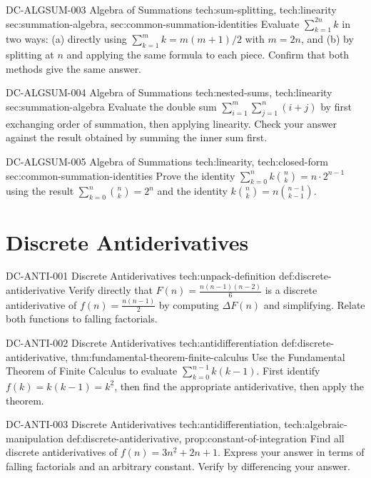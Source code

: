 \exstubgenfull
  {DC-ALGSUM-003}
  {Algebra of Summations}
  {tech:sum-splitting, tech:linearity}
  {sec:summation-algebra, sec:common-summation-identities}
  {Evaluate \(\displaystyle\sum_{k=1}^{2n} k\) in two ways:
  (a) directly using \(\sum_{k=1}^{m}k = m(m+1)/2\) with \(m = 2n\), and
  (b) by splitting at \(n\) and applying the same formula to each piece.
  Confirm that both methods give the same answer.}

\exstubgenfull
  {DC-ALGSUM-004}
  {Algebra of Summations}
  {tech:nested-sums, tech:linearity}
  {sec:summation-algebra}
  {Evaluate the double sum
  \(\displaystyle\sum_{i=1}^{m}\sum_{j=1}^{n}(i+j)\)
  by first exchanging order of summation, then applying linearity.
  Check your answer against the result obtained by summing
  the inner sum first.}

\exstubgenfull
  {DC-ALGSUM-005}
  {Algebra of Summations}
  {tech:linearity, tech:closed-form}
  {sec:common-summation-identities}
  {Prove the identity
  \(\displaystyle\sum_{k=0}^{n} k\binom{n}{k} = n\cdot 2^{n-1}\)
  using the result \(\displaystyle\sum_{k=0}^{n}\binom{n}{k} = 2^n\)
  and the identity \(k\binom{n}{k} = n\binom{n-1}{k-1}\).}

\section*{Discrete Antiderivatives}

\exstubgenfull
  {DC-ANTI-001}
  {Discrete Antiderivatives}
  {tech:unpack-definition}
  {def:discrete-antiderivative}
  {Verify directly that \(F(n) = \frac{n(n-1)(n-2)}{6}\) is a discrete
  antiderivative of \(f(n) = \frac{n(n-1)}{2}\) by computing \(\Delta F(n)\)
  and simplifying. Relate both functions to falling factorials.}

\exstubgenfull
  {DC-ANTI-002}
  {Discrete Antiderivatives}
  {tech:antidifferentiation}
  {def:discrete-antiderivative, thm:fundamental-theorem-finite-calculus}
  {Use the Fundamental Theorem of Finite Calculus to evaluate
  \(\displaystyle\sum_{k=0}^{n-1} k(k-1)\).
  First identify \(f(k) = k(k-1) = k^{\underline{2}}\), then find the
  appropriate antiderivative, then apply the theorem.}

\exstubgenfull
  {DC-ANTI-003}
  {Discrete Antiderivatives}
  {tech:antidifferentiation, tech:algebraic-manipulation}
  {def:discrete-antiderivative, prop:constant-of-integration}
  {Find all discrete antiderivatives of \(f(n) = 3n^{\underline{2}} + 2n + 1\).
  Express your answer in terms of falling factorials and an arbitrary
  constant. Verify by differencing your answer.}

